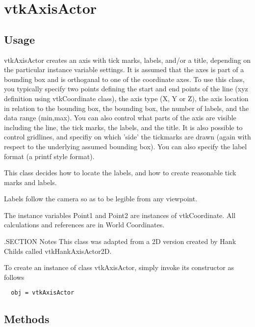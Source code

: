 \section{vtkAxisActor}

\subsection{Usage}

 vtkAxisActor creates an axis with tick marks, labels, and/or a title,
 depending on the particular instance variable settings. It is assumed that
 the axes is part of a bounding box and is orthoganal to one of the
 coordinate axes.  To use this class, you typically specify two points 
 defining the start and end points of the line (xyz definition using 
 vtkCoordinate class), the axis type (X, Y or Z), the axis location in 
 relation to the bounding box, the bounding box, the number of labels, and
 the data range (min,max). You can also control what parts of the axis are
 visible including the line, the tick marks, the labels, and the title. It
 is also possible to control gridlines, and specifiy on which 'side' the
 tickmarks are drawn (again with respect to the underlying assumed 
 bounding box). You can also specify the label format (a printf style format).

 This class decides how to locate the labels, and how to create reasonable 
 tick marks and labels. 

 Labels follow the camera so as to be legible from any viewpoint.

 The instance variables Point1 and Point2 are instances of vtkCoordinate.
 All calculations and references are in World Coordinates.

 .SECTION Notes
 This class was adapted from a 2D version created by Hank Childs called
 vtkHankAxisActor2D.


To create an instance of class vtkAxisActor, simply
invoke its constructor as follows
\begin{verbatim}
  obj = vtkAxisActor
\end{verbatim}
\subsection{Methods}

